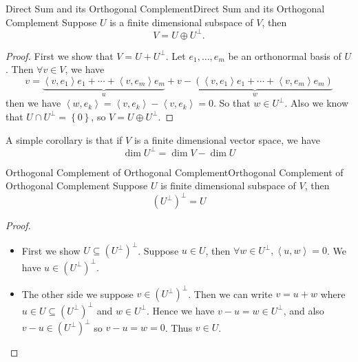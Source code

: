 \documentclass[../main.tex]{subfiles}
\begin{document}
\begin{proposition}{Direct Sum and its Orthogonal Complement}{Direct Sum and its Orthogonal Complement}
Suppose $U$ is a finite dimensional subspace of $V$, then
\begin{equation}
V = U \oplus U^{\perp}.
\end{equation}
\end{proposition}
\begin{proof}
First we show that $V=U+U^{\perp}$. Let $e_1, \ldots ,e_m$ be an orthonormal basis of $U$. Then $\forall v\in V$, we have
\begin{equation*}
	v = \underbrace{\left<v,e_1\right> e_1 +\cdots +\left<v,e_m\right> e_m}_{u} + \underbrace{ v-(\left<v,e_1\right> e_1 +\cdots +\left<v,e_m\right> e_m)}_{w}
\end{equation*}
then we have $\left<w,e_k\right>  = \left<v,e_k\right> - \left<v,e_k\right> =0$. So that $w\in U^{\perp}$. Also we know that $U\cap U^{\perp} = \left\{ 0 \right\}$, so $V = U \oplus U^{\perp}$.
\end{proof}

A simple corollary is that if $V$ is a finite dimensional vector space, we have
\begin{equation*}
\dim U^{\perp} = \dim V-\dim U
\end{equation*}

\begin{theorem}{Orthogonal Complement of Orthogonal Complement}{Orthogonal Complement of Orthogonal Complement}
Suppose $U$ is finite dimensional subspace of $V$, then
\begin{equation}
	(U^{\perp})^{\perp} = U
\end{equation}
\end{theorem}
\begin{proof}
\begin{itemize}
\item First we show $U \subseteq (U^{\perp})^{\perp}$. Suppose $u\in U$, then $\forall w\in U^{\perp}, \left<u,w\right> = 0$. We have $u\in (U^{\perp})^{\perp}$.
\item The other side we suppose $v\in (U^{\perp})^{\perp}$. Then we can write $v=u+w$ where $u\in U \subseteq (U^{\perp})^{\perp}$ and $w\in U^{\perp}$. Hence we have $v-u=w\in U^{\perp}$, and also $v-u\in (U^{\perp})^{\perp}$ so $v-u=w=0$. Thus $v\in U$.
\end{itemize}
\end{proof}
\end{document}
